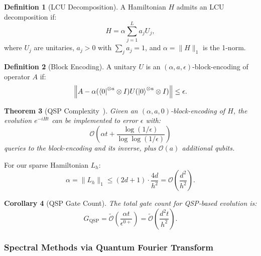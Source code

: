 \documentclass[11pt,a4paper]{article}
\newcommand{\Order}{\mathcal{O}}
\newcommand{\Otilde}{\widetilde{\mathcal{O}}}
\newcommand{\laph}{L_h}
\theoremstyle{plain}
\newtheorem{theorem}{Theorem}[section]
\newtheorem{corollary}[theorem]{Corollary}
\theoremstyle{definition}
\newtheorem{definition}[theorem]{Definition}
\theoremstyle{remark}
\begin{document}
\begin{definition}[LCU Decomposition]
A Hamiltonian $H$ admits an LCU decomposition if:
\begin{equation}\label{eq:lcu}
    H = \alpha \sum_{j=1}^L a_j U_j,
\end{equation}
where $U_j$ are unitaries, $a_j > 0$ with $\sum_j a_j = 1$, and $\alpha = \|H\|_1$ is the 1-norm.
\end{definition}

\begin{definition}[Block Encoding]
A unitary $U$ is an $(\alpha, a, \epsilon)$-block-encoding of operator $A$ if:
\begin{equation}
    \left\| A - \alpha (\bra{0}^{\otimes a} \otimes I) U (\ket{0}^{\otimes a} \otimes I) \right\| \leq \epsilon.
\end{equation}
\end{definition}

\begin{theorem}[QSP Complexity~\cite{low2017optimal,gilyen2019quantum}]\label{thm:qsp}
Given an $(\alpha, a, 0)$-block-encoding of $H$, the evolution $e^{-iHt}$ can be implemented to error $\epsilon$ with:
\begin{equation}\label{eq:qsp_complexity}
    \Order\left(\alpha t + \frac{\log(1/\epsilon)}{\log\log(1/\epsilon)}\right)
\end{equation}
queries to the block-encoding and its inverse, plus $\Order(a)$ additional qubits.
\end{theorem}

For our sparse Hamiltonian $\laph$:
\begin{equation}
    \alpha = \|\laph\|_1 \leq (2d+1) \cdot \frac{4d}{h^2} = \Order\left(\frac{d^2}{h^2}\right).
\end{equation}

\begin{corollary}[QSP Gate Count]
The total gate count for QSP-based evolution is:
\begin{equation}\label{eq:qsp_gates}
    G_{\text{QSP}} = \Otilde\left(\frac{\alpha t}{\epsilon^{0+}}\right) = \Otilde\left(\frac{d^2 t}{h^2}\right).
\end{equation}
\end{corollary}

\subsubsection{Spectral Methods via Quantum Fourier Transform}
\end{document}
